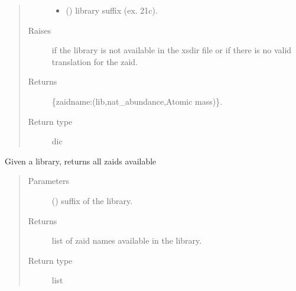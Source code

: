 \documentclass[letterpaper,10pt,english]{sphinxmanual}
\begin{document}
\begin{fulllineitems}
\begin{fulllineitems}
\begin{quote}
\begin{description}
\begin{itemize}
\item {} 
 () \textendash{} library suffix (ex. 21c).

\end{itemize}

\item[{Raises}] \leavevmode
{} \textendash{} if the library is not available in the xsdir file or if there is
    no valid translation for the zaid.

\item[{Returns}] \leavevmode
{} \textendash{} \{zaidname:(lib,nat\_abundance,Atomic mass)\}.

\item[{Return type}] \leavevmode
dic

\end{description}\end{quote}

\end{fulllineitems}


\begin{fulllineitems}
\label{\detokenize{api/initobjects:libmanager.LibManager.get_libzaids}}
Given a library, returns all zaids available
\begin{quote}\begin{description}
\item[{Parameters}] \leavevmode
{} () \textendash{} suffix of the library.

\item[{Returns}] \leavevmode
{} \textendash{} list of zaid names available in the library.

\item[{Return type}] \leavevmode
list

\end{description}\end{quote}

\end{fulllineitems}



\end{fulllineitems}
\end{document}
